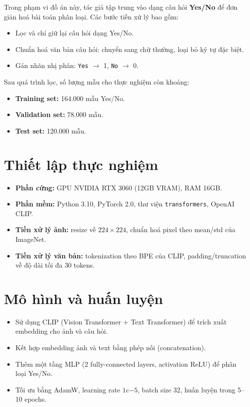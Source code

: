Trong phạm vi đồ án này, tác giả tập trung vào dạng câu hỏi \textbf{Yes/No} để đơn giản hoá bài toán phân loại. 
Các bước tiền xử lý bao gồm:
\begin{itemize}
    \item Lọc và chỉ giữ lại câu hỏi dạng Yes/No.
    \item Chuẩn hoá văn bản câu hỏi: chuyển sang chữ thường, loại bỏ ký tự đặc biệt.
    \item Gán nhãn nhị phân: \texttt{Yes} $\rightarrow$ 1, \texttt{No} $\rightarrow$ 0.
\end{itemize}

Sau quá trình lọc, số lượng mẫu cho thực nghiệm còn khoảng:
\begin{itemize}
    \item \textbf{Training set:} 164.000 mẫu Yes/No.
    \item \textbf{Validation set:} 78.000 mẫu.
    \item \textbf{Test set:} 120.000 mẫu.
\end{itemize}

\section{Thiết lập thực nghiệm}
\begin{itemize}
    \item \textbf{Phần cứng:} GPU NVIDIA RTX 3060 (12GB VRAM), RAM 16GB.
    \item \textbf{Phần mềm:} Python 3.10, PyTorch 2.0, thư viện \texttt{transformers}, OpenAI CLIP.
    \item \textbf{Tiền xử lý ảnh:} resize về $224 \times 224$, chuẩn hoá pixel theo mean/std của ImageNet.
    \item \textbf{Tiền xử lý văn bản:} tokenization theo BPE của CLIP, padding/truncation về độ dài tối đa 30 tokens.
\end{itemize}

\section{Mô hình và huấn luyện}
\begin{itemize}
    \item Sử dụng CLIP (Vision Transformer + Text Transformer) để trích xuất embedding cho ảnh và câu hỏi.
    \item Kết hợp embedding ảnh và text bằng phép nối (concatenation).
    \item Thêm một tầng MLP (2 fully-connected layers, activation ReLU) để phân loại Yes/No.
    \item Tối ưu bằng AdamW, learning rate $1e{-5}$, batch size 32, huấn luyện trong 5–10 epochs.
\end{itemize}

